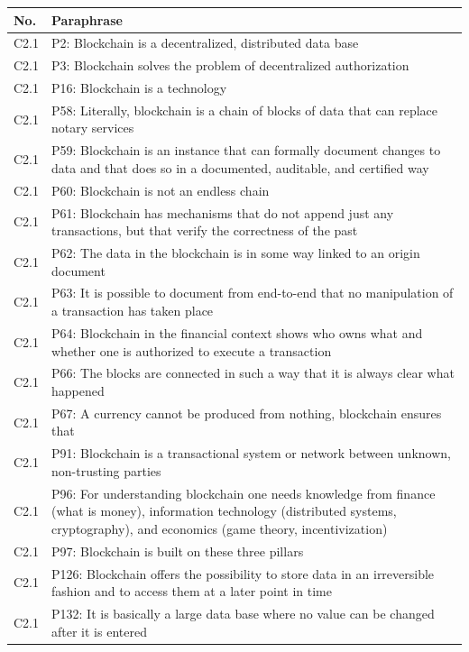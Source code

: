\begin{table}[H]
    \centering
    \begin{tabularx}{\textwidth}{l|X}
    No. & Paraphrase \\\hline
    C2.1 & P2: Blockchain is a decentralized, distributed data base \\  
	C2.1 & P3: Blockchain solves the problem of decentralized authorization \\  
	C2.1 & P16: Blockchain is a technology \\  
	C2.1 & P58: Literally, blockchain is a chain of blocks of data that can replace notary services \\  
	C2.1 & P59: Blockchain is an instance that can formally document changes to data and that does so in a documented, auditable, and certified way \\  
	C2.1 & P60: Blockchain is not an endless chain \\  
	C2.1 & P61: Blockchain has mechanisms that do not append just any transactions, but that verify the correctness of the past \\  
	C2.1 & P62: The data in the blockchain is in some way linked to an origin document \\  
	C2.1 & P63: It is possible to document from end-to-end that no manipulation of a transaction has taken place \\  
	C2.1 & P64: Blockchain in the financial context shows who owns what and whether one is authorized to execute a transaction \\  
	C2.1 & P66: The blocks are connected in such a way that it is always clear what happened \\  
	C2.1 & P67: A currency cannot be produced from nothing, blockchain ensures that \\  
	C2.1 & P91: Blockchain is a transactional system or network between unknown, non-trusting parties \\  
	C2.1 & P96: For understanding blockchain one needs knowledge from finance (what is money), information technology (distributed systems, cryptography), and economics (game theory, incentivization) \\  
	C2.1 & P97: Blockchain is built on these three pillars \\  
	C2.1 & P126: Blockchain offers the possibility to store data in an irreversible fashion and to access them at a later point in time \\  
	C2.1 & P132: It is basically a large data base where no value can be changed after it is entered \\\hline

\end{tabularx}
\end{table}
